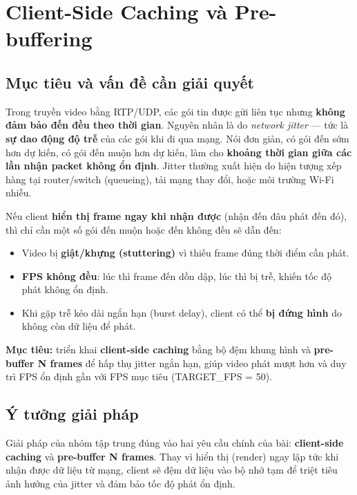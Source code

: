 
\section{Client-Side Caching và Pre-buffering}

\subsection{Mục tiêu và vấn đề cần giải quyết}
Trong truyền video bằng RTP/UDP, các gói tin được gửi liên tục nhưng \textbf{không đảm bảo đến đều theo thời gian}. Nguyên nhân là do \textit{network jitter} — tức là \textbf{sự dao động độ trễ} của các gói khi đi qua mạng. Nói đơn giản, có gói đến sớm hơn dự kiến, có gói đến muộn hơn dự kiến, làm cho \textbf{khoảng thời gian giữa các lần nhận packet không ổn định}. Jitter thường xuất hiện do hiện tượng xếp hàng tại router/switch (queueing), tải mạng thay đổi, hoặc môi trường Wi-Fi nhiễu.

Nếu client \textbf{hiển thị frame ngay khi nhận được} (nhận đến đâu phát đến đó), thì chỉ cần một số gói đến muộn hoặc đến không đều sẽ dẫn đến:
\begin{itemize}
    \item Video bị \textbf{giật/khựng (stuttering)} vì thiếu frame đúng thời điểm cần phát.
    \item \textbf{FPS không đều}: lúc thì frame đến dồn dập, lúc thì bị trễ, khiến tốc độ phát không ổn định.
    \item Khi gặp trễ kéo dài ngắn hạn (burst delay), client có thể \textbf{bị đứng hình} do không còn dữ liệu để phát.
\end{itemize}

\textbf{Mục tiêu:} triển khai \textbf{client-side caching} bằng bộ đệm khung hình và \textbf{pre-buffer N frames} để hấp thụ jitter ngắn hạn, giúp video phát mượt hơn và duy trì FPS ổn định gần với FPS mục tiêu (TARGET_FPS = 50).


\subsection{Ý tưởng giải pháp}
Giải pháp của nhóm tập trung đúng vào hai yêu cầu chính của bài: \textbf{client-side caching} và \textbf{pre-buffer N frames}. Thay vì hiển thị (render) ngay lập tức khi nhận được dữ liệu từ mạng, client sẽ đệm dữ liệu vào bộ nhớ tạm để triệt tiêu ảnh hưởng của jitter và đảm bảo tốc độ phát ổn định.

